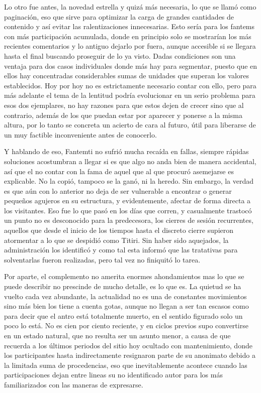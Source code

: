 \documentclass[
]{book}
\begin{document}
Lo otro fue antes, la novedad estrella y quizá más necesaria, lo que se llamó como paginación, eso que sirve para optimizar la carga de grandes cantidades de contenido y así evitar las ralentizaciones innecesarias. Esto sería para los fantems con más participación acumulada, donde en principio solo se mostrarían los más recientes comentarios y lo antiguo dejarlo por fuera, aunque accesible si se llegara hasta el final buscando proseguir de lo ya visto. Dadas condiciones son una ventaja para dos casos individuales donde más hay para segmentar, puesto que en ellos hay concentradas considerables sumas de unidades que superan los valores establecidos. Hoy por hoy no es estrictamente necesario contar con ello, pero para más adelante el tema de la lentitud podría evolucionar en un serio problema para esos dos ejemplares, no hay razones para que estos dejen de crecer sino que al contrario, además de los que puedan estar por aparecer y ponerse a la misma altura, por lo tanto se concreta un acierto de cara al futuro, útil para liberarse de un muy factible inconveniente antes de conocerlo.

Y hablando de eso, Fantemti no sufrió mucha recaída en fallas, siempre rápidas soluciones acostumbran a llegar si es que algo no anda bien de manera accidental, así que el no contar con la fama de aquel que al que procuró asemejarse es explicable. No la copió, tampoco se la ganó, ni la heredo. Sin embargo, la verdad es que aún con lo anterior no deja de ser vulnerable a encontrar o generar pequeños agujeros en su estructura, y evidentemente, afectar de forma directa a los visitantes. Eso fue lo que pasó en los días que corren, y casualmente trastocó un punto no es desconocido para la predecesora, los cierres de sesión recurrentes, aquellos que desde el inicio de los tiempos hasta el discreto cierre supieron atormentar a lo que se despidió como Titiri. Sin haber sido aquejados, la administración los identificó y como tal esta informó que las tratativas para solventarlas fueron realizadas, pero tal vez no finiquitó lo tarea.

Por aparte, el complemento no amerita enormes ahondamientos mas lo que se puede describir no prescinde de mucho detalle, es lo que es. La quietud se ha vuelto cada vez abundante, la actualidad no es una de constantes movimientos sino más bien los tiene a cuenta gotas, aunque no llegan a ser tan escasos como para decir que el antro está totalmente muerto, en el sentido figurado solo un poco lo está. No es cien por ciento reciente, y en ciclos previos supo convertirse en un estado natural, que no resulta ser un asunto menor, a causa de que recuerda a los últimos periodos del sitio hoy ocultado con mantenimiento, donde los participantes hasta indirectamente resignaron parte de su anonimato debido a la limitada suma de procedencias, eso que inevitablemente acontece cuando las participaciones dejan entre lineas su no identificado autor para los más familiarizados con las maneras de expresarse.
\end{document}
